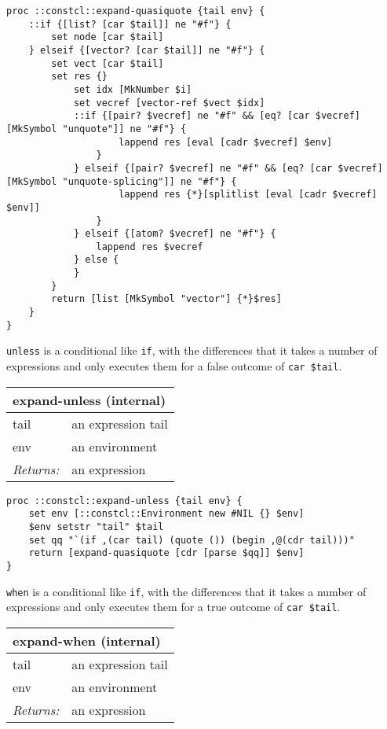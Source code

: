 \documentclass{report}
\begin{document}
\noindent\makebox[\linewidth]{\rule{\linewidth}{0.4pt}}
\begin{lstlisting}
proc ::constcl::expand-quasiquote {tail env} {
    ::if {[list? [car $tail]] ne "#f"} {
        set node [car $tail]
    } elseif {[vector? [car $tail]] ne "#f"} {
        set vect [car $tail]
        set res {}
            set idx [MkNumber $i]
            set vecref [vector-ref $vect $idx]
            ::if {[pair? $vecref] ne "#f" && [eq? [car $vecref] [MkSymbol "unquote"]] ne "#f"} {
                    lappend res [eval [cadr $vecref] $env]
                }
            } elseif {[pair? $vecref] ne "#f" && [eq? [car $vecref] [MkSymbol "unquote-splicing"]] ne "#f"} {
                    lappend res {*}[splitlist [eval [cadr $vecref] $env]]
                }
            } elseif {[atom? $vecref] ne "#f"} {
                lappend res $vecref
            } else {
            }
        }
        return [list [MkSymbol "vector"] {*}$res]
    }
}
\end{lstlisting}
\noindent\makebox[\linewidth]{\rule{\linewidth}{0.4pt}}

\texttt{unless} is a conditional like \texttt{if}, with the differences that it takes a number of expressions and only executes them for a false outcome of \texttt{car \$tail}.

\begin{tabular}{ |l l| }
\hline
\multicolumn{2}{|l|}{expand-unless (internal)} \\
\hline
tail & an expression tail \\
env & an environment \\
\textit{Returns:} & an expression \\
\hline
\end{tabular}

\noindent\makebox[\linewidth]{\rule{\linewidth}{0.4pt}}
\begin{lstlisting}
proc ::constcl::expand-unless {tail env} {
    set env [::constcl::Environment new #NIL {} $env]
    $env setstr "tail" $tail
    set qq "`(if ,(car tail) (quote ()) (begin ,@(cdr tail)))"
    return [expand-quasiquote [cdr [parse $qq]] $env]
}
\end{lstlisting}
\noindent\makebox[\linewidth]{\rule{\linewidth}{0.4pt}}

\texttt{when} is a conditional like \texttt{if}, with the differences that it takes a number of expressions and only executes them for a true outcome of \texttt{car \$tail}.

\begin{tabular}{ |l l| }
\hline
\multicolumn{2}{|l|}{expand-when (internal)} \\
\hline
tail & an expression tail \\
env & an environment \\
\textit{Returns:} & an expression \\
\hline
\end{tabular}
\end{document}
